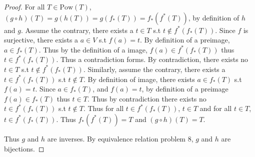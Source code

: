 \documentclass{article}
\newcommand{\Pow}[1]{\text{Pow}(#1)}
\begin{document}
\begin{proof}
	For all $T \in \Pow{T}$, $(g \circ h)(T) = g(h(T)) = g(f_*(T)) = f_*(f^*(T))$, by definition of $h$ and $g$. Assume the contrary, there exists a $t \in T$ s.t $t \not \in f^*(f_*(T))$. Since $f$ is surjective, there exists a $a \in V$ s.t $f(a) = t$. By definition of a preimage, $a \in f_*(T)$. Thus by the definition of a image, $f(a) \in f^*(f_*(T))$ thus $t \in f^*(f_*(T))$. Thus a contradiction forms. By contradiction, there exists no $t \in T$ s.t $t \not \in f^*(f_*(T))$. Similarly, assume the contrary, there exists a $t \in f^*(f_*(T))$ s.t $t \not \in T$. By definition of image, there exists $a \in f_*(T)$ s.t $f(a) = t$. Since $a \in f_*(T)$, and $f(a) = t$, by definition of a preimage $f(a) \in f_*(T)$ thus $t \in T$. Thus by contradiction there exists no $t \in f^*(f_*(T))$ s.t $t \not \in T$. Thus for all $t \in f^*(f_*(T))$, $t \in T$ and for all $t \in T$, $t \in f^*(f_*(T))$. Thus $f_*(f^*(T)) = T$ and $(g \circ h)(T) = T$. 

	Thus $g$ and $h$ are inverses. By equivalence relation problem 8, $g$ and $h$ are bijections.
\end{proof}
\end{document}
